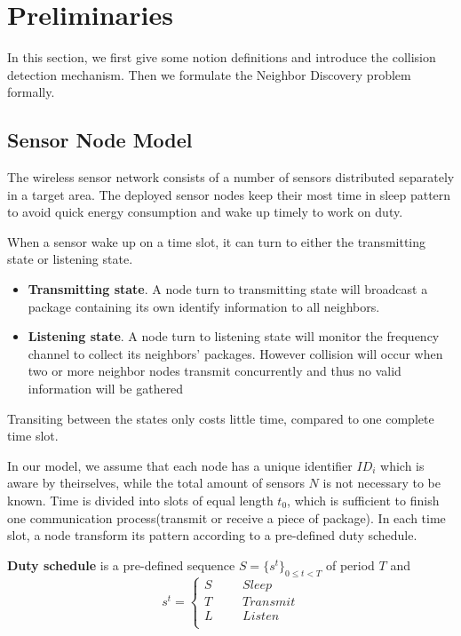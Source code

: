 \section{Preliminaries}
\label{sectionmodel}

In this section, we first give some notion definitions and introduce the collision detection mechanism. 
Then we formulate the Neighbor Discovery problem formally.  

\subsection{Sensor Node Model}

The wireless sensor network consists of a number of sensors distributed separately in a target area.
The deployed sensor nodes keep their most time in sleep pattern to avoid quick energy consumption 
and wake up timely to work on duty.

When a sensor wake up on a time slot, it can turn to either the transmitting state or listening state. 
\begin{itemize}
\item \textbf{Transmitting state}. A node turn to transmitting state will broadcast a package containing its own identify 
information to all neighbors.
\item  \textbf{Listening state}. A node turn to listening state will monitor the frequency channel to collect its neighbors' packages.
However collision will occur when two or more neighbor nodes transmit concurrently and thus no valid information will be gathered
\end{itemize}
Transiting between the states only costs little time, compared to one complete time slot.

In our model, we assume that each node has a unique identifier $ID_i$ which is aware by theirselves, while the total amount of sensors $N$  is not necessary to be known. Time is divided into slots of equal length $t_0$, 
which is sufficient to finish  one communication process(transmit or receive a piece of package). In each time slot, a node transform its pattern according to a pre-defined duty schedule.


\begin{definition}
\textbf{Duty schedule} is a pre-defined sequence $S=\{s^t\}_{0\leq t<T}$ of period $T$ and
$$ s^t=\left\{
\begin{aligned}
S  & & & {Sleep}\\
T  & & & {Transmit}\\
L  & & & {Listen}\\
\end{aligned}
\right.
$$
\end{definition}

